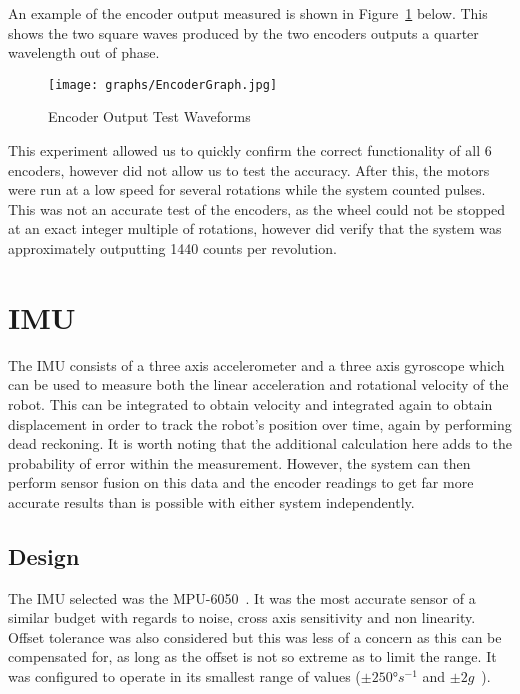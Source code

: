 An example of the encoder output measured is shown in Figure~\ref{EncoderGraph} below. This shows the two square waves produced by the
two encoders outputs a quarter wavelength out of phase.

\begin{figure}[!ht]
	\centering
	\texttt{[image: graphs/EncoderGraph.jpg]}
	\caption{Encoder Output Test Waveforms}\label{EncoderGraph}

\end{figure}

This experiment allowed us to quickly confirm the correct functionality
of all 6 encoders, however did not allow us to test the accuracy. After
this, the motors were run at a low speed for several rotations while the
system counted pulses. This was not an accurate test of the encoders, as
the wheel could not be stopped at an exact integer multiple of rotations,
however did verify that the system was approximately outputting 1440
counts per revolution.

\section{IMU}\label{elec/imu}
The IMU consists of a three axis accelerometer and a three axis gyroscope
which can be used to measure both the linear acceleration and rotational
velocity of the robot. This can be integrated to obtain velocity and integrated again
to obtain displacement in order to track the robot's position over time, again by performing dead reckoning. It is worth noting
that the additional calculation here adds to the probability of error within the measurement. However, the
system can then perform sensor fusion on this data and the encoder
readings to get far more accurate results than is possible with either system
independently.

\subsection{Design}\label{elec/imu/design}
The IMU selected was the MPU-6050~\cite{MPU6050Datasheet}. It was the most accurate sensor of a
similar budget with regards to noise, cross axis sensitivity and non
linearity. Offset tolerance was also considered but this was less of a
concern as this can be compensated for, as long as the offset is not
so extreme as to limit the range. It was configured to operate in its
smallest range of values ($\pm\ang{250}s^{-1}$ and $\pm2g$~\cite{MPU6050Datasheet}).

